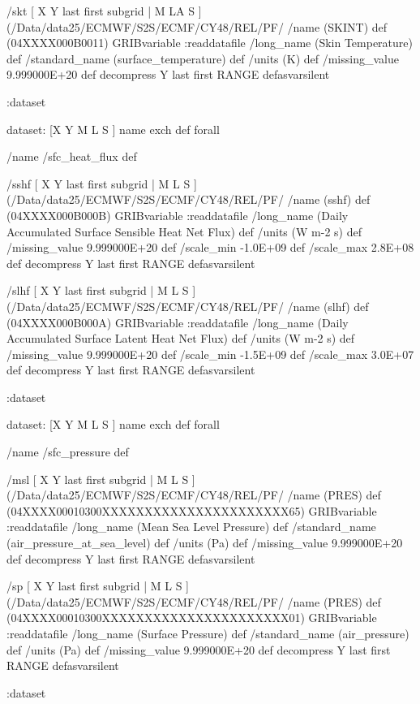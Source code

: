 \begin{ingrid}
/skt { [ X Y last first subgrid | M LA S ] (/Data/data25/ECMWF/S2S/ECMF/CY48/REL/PF/%
/name (SKINT) def
(04XXXX000B0011) GRIBvariable
:readdatafile
/long_name (Skin Temperature) def
/standard_name (surface_temperature) def
/units (K) def
/missing_value 9.999000E+20 def
decompress
Y last first RANGE
} defasvarsilent

:dataset


dataset:
[X Y M L S ] {name exch def } forall

/name /sfc_heat_flux def

/sshf { [ X Y last first subgrid | M L S ] (/Data/data25/ECMWF/S2S/ECMF/CY48/REL/PF/%
/name (sshf) def
(04XXXX000B000B) GRIBvariable
:readdatafile
/long_name (Daily Accumulated Surface Sensible Heat Net Flux) def
/units (W m-2 s) def
/missing_value 9.999000E+20 def
/scale_min -1.0E+09 def
/scale_max 2.8E+08 def
decompress
Y last first RANGE
} defasvarsilent

/slhf { [ X Y last first subgrid | M L S ] (/Data/data25/ECMWF/S2S/ECMF/CY48/REL/PF/%
/name (slhf) def
(04XXXX000B000A) GRIBvariable
:readdatafile
/long_name (Daily Accumulated Surface Latent Heat Net Flux) def
/units (W m-2 s) def
/missing_value 9.999000E+20 def
/scale_min -1.5E+09 def
/scale_max 3.0E+07 def
decompress
Y last first RANGE
} defasvarsilent

:dataset

dataset:
[X Y M L S ] {name exch def } forall

/name /sfc_pressure def

/msl { [ X Y last first subgrid | M L S ] (/Data/data25/ECMWF/S2S/ECMF/CY48/REL/PF/%
/name (PRES) def
(04XXXX00010300XXXXXXXXXXXXXXXXXXXXXX65) GRIBvariable
:readdatafile
/long_name (Mean Sea Level Pressure) def
/standard_name (air_pressure_at_sea_level) def
/units (Pa) def
/missing_value 9.999000E+20 def
decompress
Y last first RANGE
} defasvarsilent

/sp { [ X Y last first subgrid | M L S ] (/Data/data25/ECMWF/S2S/ECMF/CY48/REL/PF/%
/name (PRES) def
(04XXXX00010300XXXXXXXXXXXXXXXXXXXXXX01) GRIBvariable
:readdatafile
/long_name (Surface Pressure) def
/standard_name (air_pressure) def
/units (Pa) def
/missing_value 9.999000E+20 def
decompress
Y last first RANGE
} defasvarsilent

:dataset

\end{ingrid}
